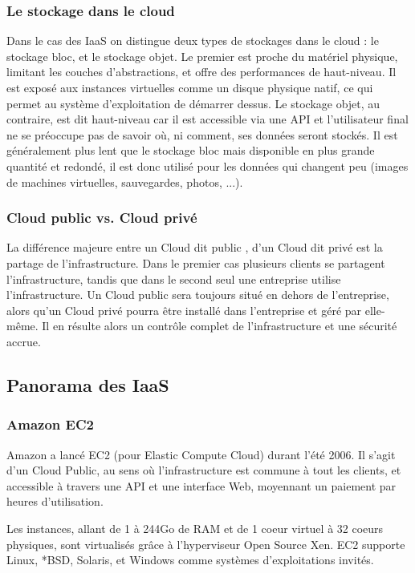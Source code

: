 \documentclass[a4paper,oneside]{report}
\begin{document}
\subsubsection{Le stockage dans le cloud}
Dans le cas des IaaS on distingue deux types de stockages dans le cloud : le stockage bloc, et le stockage objet.
Le premier est proche du matériel physique, limitant les couches d'abstractions, et offre des performances de haut-niveau.
Il est exposé aux instances virtuelles comme un disque physique natif, ce qui permet au système d'exploitation de démarrer dessus.\newline
Le stockage objet, au contraire, est dit \og haut-niveau \fg car il est accessible via une API et l'utilisateur final ne se préoccupe pas de savoir où, ni comment, ses données seront stockés.
Il est généralement plus lent que le stockage bloc mais disponible en plus grande quantité et redondé, il est donc utilisé pour les données qui changent peu (images de machines virtuelles, sauvegardes, photos, ...).

\subsubsection{Cloud public vs. Cloud privé}
La différence majeure entre un Cloud dit \og public \fg, d'un Cloud dit \og privé \fg est la partage de l'infrastructure.
Dans le premier cas plusieurs clients se partagent l'infrastructure, tandis que dans le second seul une entreprise utilise l'infrastructure.\newline
Un Cloud public sera toujours situé en dehors de l'entreprise, alors qu'un Cloud privé pourra être installé dans l'entreprise et géré par elle-même.
Il en résulte alors un contrôle complet de l'infrastructure et une sécurité accrue.

\subsection{Panorama des IaaS}
\subsubsection{Amazon EC2}
Amazon a lancé EC2 (pour Elastic Compute Cloud) durant l'été 2006.
Il s'agit d'un Cloud Public, au sens où l'infrastructure est commune à tout les clients, et accessible à travers une API et une interface Web, moyennant un paiement par heures d'utilisation.

Les instances, allant de 1 à 244Go de RAM et de 1 coeur virtuel à 32 coeurs physiques, sont virtualisés grâce à l'hyperviseur Open Source Xen.
EC2 supporte Linux, *BSD, Solaris, et Windows comme systèmes d'exploitations invités.
\end{document}
